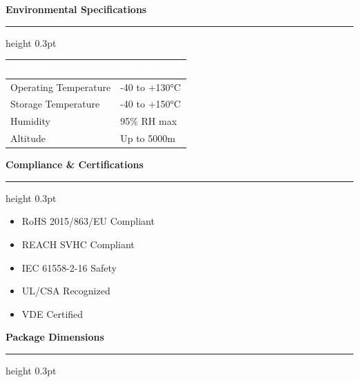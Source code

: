 \documentclass[10pt,a4paper]{article}
\newcommand{\sectiontitle}[1]{%
    \vspace{3mm}%
    {\large\bfseries\color{primary}#1}%
    \vspace{1mm}%
    \hrule height 0.3pt%
    \vspace{2mm}%
}
\begin{document}
\begin{minipage}[t]{0.48\textwidth}
\sectiontitle{Environmental Specifications}
{\footnotesize
\begin{tabular}{|L{35mm}|L{25mm}|}
\hline
{}
\textcolor{white}{\textbf{Parameter}} & \textcolor{white}{\textbf{Specification}} \\
\hline
Operating Temperature & -40 to +130°C \\
Storage Temperature & -40 to +150°C \\
Humidity & 95\% RH max \\
Altitude & Up to 5000m \\
\hline
\end{tabular}
}
\end{minipage}
\hfill
\begin{minipage}[t]{0.48\textwidth}
\sectiontitle{Compliance \& Certifications}
\begin{itemize}[leftmargin=4mm, itemsep=0pt, topsep=0pt]
    \item[\textcolor{success}{\checkmark}] RoHS 2015/863/EU Compliant
    \item[\textcolor{success}{\checkmark}] REACH SVHC Compliant
    \item[\textcolor{success}{\checkmark}] IEC 61558-2-16 Safety
    \item[\textcolor{success}{\checkmark}] UL/CSA Recognized
    \item[\textcolor{success}{\checkmark}] VDE Certified
\end{itemize}
\end{minipage}

\vspace{4mm}

\sectiontitle{Package Dimensions}
\end{document}
